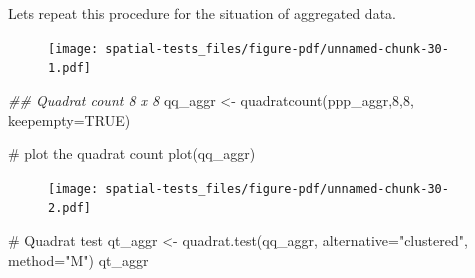 \documentclass[
  letterpaper,
]{book}
\newenvironment{Shaded}{\begin{snugshade}}{\end{snugshade}}
\newcommand{\AttributeTok}[1]{\textcolor[rgb]{0.40,0.45,0.13}{#1}}
\newcommand{\CommentTok}[1]{\textcolor[rgb]{0.37,0.37,0.37}{#1}}
\newcommand{\ConstantTok}[1]{\textcolor[rgb]{0.56,0.35,0.01}{#1}}
\newcommand{\DecValTok}[1]{\textcolor[rgb]{0.68,0.00,0.00}{#1}}
\newcommand{\DocumentationTok}[1]{\textcolor[rgb]{0.37,0.37,0.37}{\textit{#1}}}
\newcommand{\FunctionTok}[1]{\textcolor[rgb]{0.28,0.35,0.67}{#1}}
\newcommand{\NormalTok}[1]{\textcolor[rgb]{0.00,0.23,0.31}{#1}}
\newcommand{\OtherTok}[1]{\textcolor[rgb]{0.00,0.23,0.31}{#1}}
\newcommand{\SpecialCharTok}[1]{\textcolor[rgb]{0.37,0.37,0.37}{#1}}
\newcommand{\StringTok}[1]{\textcolor[rgb]{0.13,0.47,0.30}{#1}}
\begin{document}
Lets repeat this procedure for the situation of aggregated data.

\begin{Shaded}
\end{Shaded}

\begin{figure}[H]

{\centering \texttt{[image: spatial-tests\_files/figure-pdf/unnamed-chunk-30-1.pdf]}

}

\end{figure}

\begin{Shaded}
\begin{Highlighting}[]
\DocumentationTok{\#\# Quadrat count 8 x 8}
\NormalTok{qq\_aggr }\OtherTok{\textless{}{-}} \FunctionTok{quadratcount}\NormalTok{(ppp\_aggr,}\DecValTok{8}\NormalTok{,}\DecValTok{8}\NormalTok{, }\AttributeTok{keepempty=}\ConstantTok{TRUE}\NormalTok{) }

\CommentTok{\# plot the quadrat count}
\FunctionTok{plot}\NormalTok{(qq\_aggr)}
\end{Highlighting}
\end{Shaded}

\begin{figure}[H]

{\centering \texttt{[image: spatial-tests\_files/figure-pdf/unnamed-chunk-30-2.pdf]}

}

\end{figure}

\begin{Shaded}
\begin{Highlighting}[]
\CommentTok{\# Quadrat test}
\NormalTok{qt\_aggr }\OtherTok{\textless{}{-}} \FunctionTok{quadrat.test}\NormalTok{(qq\_aggr, }\AttributeTok{alternative=}\StringTok{"clustered"}\NormalTok{, }\AttributeTok{method=}\StringTok{"M"}\NormalTok{)}
\NormalTok{qt\_aggr}
\end{Highlighting}
\end{Shaded}
\end{document}
